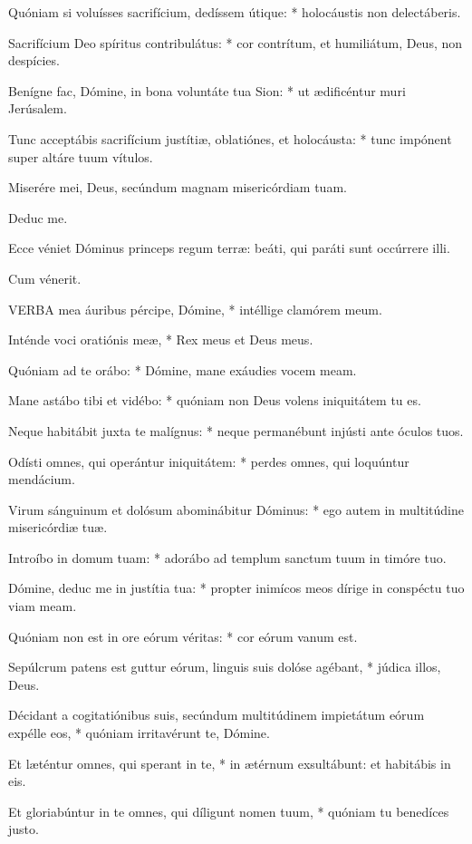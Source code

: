 Quóniam si voluísses sacrifícium, dedíssem útique: * holocáustis non delectáberis.

Sacrifícium Deo spíritus contribulátus: * cor contrítum, et humiliátum, Deus, non despícies.

Benígne fac, Dómine, in bona voluntáte tua Sion: * ut ædificéntur muri Jerúsalem.

Tunc acceptábis sacrifícium justítiæ, oblatiónes, et holocáusta: * tunc impónent super altáre tuum vítulos.

 Miserére mei, Deus, secúndum magnam misericórdiam tuam.

 Deduc me.

  Ecce véniet Dóminus princeps regum terræ: beáti, qui paráti sunt occúrrere illi.

 Cum vénerit.


\lettrine[lines=2]{V}{ERBA} mea áuribus pércipe, Dómine, * intéllige clamórem meum.

Inténde voci oratiónis meæ, * Rex meus et Deus meus.

Quóniam ad te orábo: * Dómine, mane exáudies vocem meam.

Mane astábo tibi et vidébo: * quóniam non Deus volens iniquitátem tu es.

Neque habitábit juxta te malígnus: * neque permanébunt injústi ante óculos tuos.

Odísti omnes, qui operántur iniquitátem: * perdes omnes, qui loquúntur mendácium.

Virum sánguinum et dolósum abominábitur Dóminus: * ego autem in multitúdine misericórdiæ tuæ.

Introíbo in domum tuam: * adorábo ad templum sanctum tuum in timóre tuo.

Dómine, deduc me in justítia tua: * propter inimícos meos dírige in conspéctu tuo viam meam.

Quóniam non est in ore eórum véritas: * cor eórum vanum est.

Sepúlcrum patens est guttur eórum, linguis suis dolóse agébant, * júdica illos, Deus.

Décidant a cogitatiónibus suis, secúndum multitúdinem impietátum eórum expélle eos, * quóniam irritavérunt te, Dómine.

Et læténtur omnes, qui sperant in te, * in ætérnum exsultábunt: et habitábis in eis.

Et gloriabúntur in te omnes, qui díligunt nomen tuum, * quóniam tu benedíces justo.

